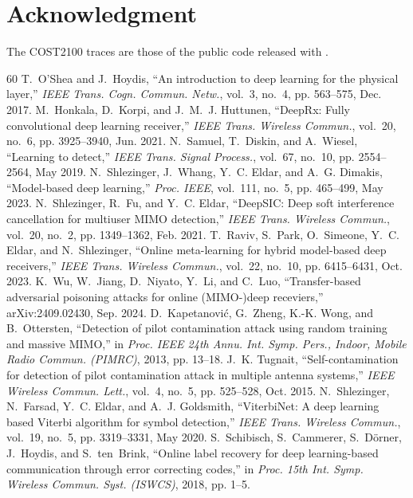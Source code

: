 \documentclass[journal]{IEEEtran}
\theoremstyle{remark}
\begin{document}
\section*{Acknowledgment}
The COST2100 traces are those of the public code released with \cite{raviv2024}.

\scriptsize\begin{thebibliography}{60}
 T.~O'Shea and J.~Hoydis, ``An introduction to deep learning for the physical layer,'' \emph{IEEE Trans. Cogn. Commun. Netw.}, vol.~3, no.~4, pp. 563--575, Dec. 2017.
 M.~Honkala, D.~Korpi, and J.~M.~J. Huttunen, ``DeepRx: Fully convolutional deep learning receiver,'' \emph{IEEE Trans. Wireless Commun.}, vol.~20, no.~6, pp. 3925--3940, Jun. 2021.
 N.~Samuel, T.~Diskin, and A.~Wiesel, ``Learning to detect,'' \emph{IEEE Trans. Signal Process.}, vol.~67, no.~10, pp. 2554--2564, May 2019.
 N.~Shlezinger, J.~Whang, Y.~C. Eldar, and A.~G. Dimakis, ``Model-based deep learning,'' \emph{Proc. IEEE}, vol.~111, no.~5, pp. 465--499, May 2023.
 N.~Shlezinger, R.~Fu, and Y.~C. Eldar, ``DeepSIC: Deep soft interference cancellation for multiuser MIMO detection,'' \emph{IEEE Trans. Wireless Commun.}, vol.~20, no.~2, pp. 1349--1362, Feb. 2021.
 T.~Raviv, S.~Park, O.~Simeone, Y.~C. Eldar, and N.~Shlezinger, ``Online meta-learning for hybrid model-based deep receivers,'' \emph{IEEE Trans. Wireless Commun.}, vol.~22, no.~10, pp. 6415--6431, Oct. 2023.
 K.~Wu, W.~Jiang, D.~Niyato, Y.~Li, and C.~Luo, ``Transfer-based adversarial poisoning attacks for online (MIMO-)deep receviers,'' arXiv:2409.02430, Sep. 2024.
 D.~Kapetanovi\'c, G.~Zheng, K.-K. Wong, and B.~Ottersten, ``Detection of pilot contamination attack using random training and massive MIMO,'' in \emph{Proc. IEEE 24th Annu. Int. Symp. Pers., Indoor, Mobile Radio Commun. (PIMRC)}, 2013, pp. 13--18.
 J.~K. Tugnait, ``Self-contamination for detection of pilot contamination attack in multiple antenna systems,'' \emph{IEEE Wireless Commun. Lett.}, vol.~4, no.~5, pp. 525--528, Oct. 2015.
 N.~Shlezinger, N.~Farsad, Y.~C. Eldar, and A.~J. Goldsmith, ``ViterbiNet: A deep learning based Viterbi algorithm for symbol detection,'' \emph{IEEE Trans. Wireless Commun.}, vol.~19, no.~5, pp. 3319--3331, May 2020.
 S.~Schibisch, S.~Cammerer, S.~D{\"o}rner, J.~Hoydis, and S.~ten~Brink, ``Online label recovery for deep learning-based communication through error correcting codes,'' in \emph{Proc. 15th Int. Symp. Wireless Commun. Syst. (ISWCS)}, 2018, pp. 1--5.

\end{thebibliography}
\end{document}
